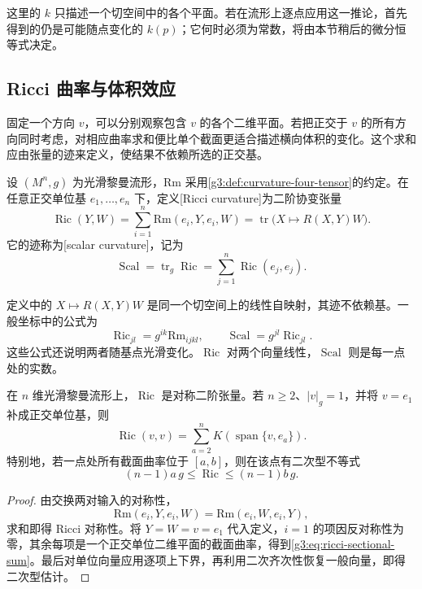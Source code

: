 这里的 \(k\) 只描述一个切空间中的各个平面。若在流形上逐点应用这一推论，首先得到的仍是可能随点变化的 \(k(p)\)；它何时必须为常数，将由本节稍后的微分恒等式决定。

\subsection{Ricci 曲率与体积效应}
\label{g3:subsec:0302:02}

固定一个方向 \(v\)，可以分别观察包含 \(v\) 的各个二维平面。若把正交于 \(v\) 的所有方向同时考虑，对相应曲率求和便比单个截面更适合描述横向体积的变化。这个求和应由张量的迹来定义，使结果不依赖所选的正交基。

\begin{definition}
	\label{g3:def:ricci-scalar}
	设 \((M^n,g)\) 为光滑黎曼流形，\(\mathrm{Rm}\) 采用\cref{g3:def:curvature-four-tensor}的约定。在任意正交单位基 \(e_1,\ldots,e_n\) 下，定义[Ricci curvature]为二阶协变张量
	\begin{equation}
		\label{g3:eq:ricci-definition}
		\operatorname{Ric}(Y,W)
		=\sum_{i=1}^n\mathrm{Rm}(e_i,Y,e_i,W)
		=\operatorname{tr}\bigl(X\mapsto R(X,Y)W\bigr).
	\end{equation}
	它的迹称为[scalar curvature]，记为
	\[
		\operatorname{Scal}=\operatorname{tr}_g\operatorname{Ric}
		=\sum_{j=1}^n\operatorname{Ric}(e_j,e_j).
	\]
\end{definition}

定义中的 \(X\mapsto R(X,Y)W\) 是同一个切空间上的线性自映射，其迹不依赖基。一般坐标中的公式为
\begin{equation}
	\label{g3:eq:ricci-scalar-contractions}
	\operatorname{Ric}_{jl}=g^{ik}\mathrm{Rm}_{ijkl},\qquad
	\operatorname{Scal}=g^{jl}\operatorname{Ric}_{jl}.
\end{equation}
这些公式还说明两者随基点光滑变化。\(\operatorname{Ric}\) 对两个向量线性，\(\operatorname{Scal}\) 则是每一点处的实数。


\begin{proposition}
	\label{g3:prop:ricci-sectional-trace}
	在 \(n\) 维光滑黎曼流形上，\(\operatorname{Ric}\) 是对称二阶张量。若 \(n\geq2\)、\(|v|_g=1\)，并将 \(v=e_1\) 补成正交单位基，则
	\begin{equation}
		\label{g3:eq:ricci-sectional-sum}
		\operatorname{Ric}(v,v)=\sum_{a=2}^nK(\operatorname{span}\{v,e_a\}).
	\end{equation}
	特别地，若一点处所有截面曲率位于 \([a,b]\)，则在该点有二次型不等式
	\[
		(n-1)a\,g\leq\operatorname{Ric}\leq(n-1)b\,g.
	\]
\end{proposition}
\begin{proof}
	由交换两对输入的对称性，
	\[
		\mathrm{Rm}(e_i,Y,e_i,W)=\mathrm{Rm}(e_i,W,e_i,Y),
	\]
	求和即得 Ricci 对称性。将 \(Y=W=v=e_1\) 代入定义，\(i=1\) 的项因反对称性为零，其余每项是一个正交单位二维平面的截面曲率，得到\eqref{g3:eq:ricci-sectional-sum}。最后对单位向量应用逐项上下界，再利用二次齐次性恢复一般向量，即得二次型估计。
\end{proof}

